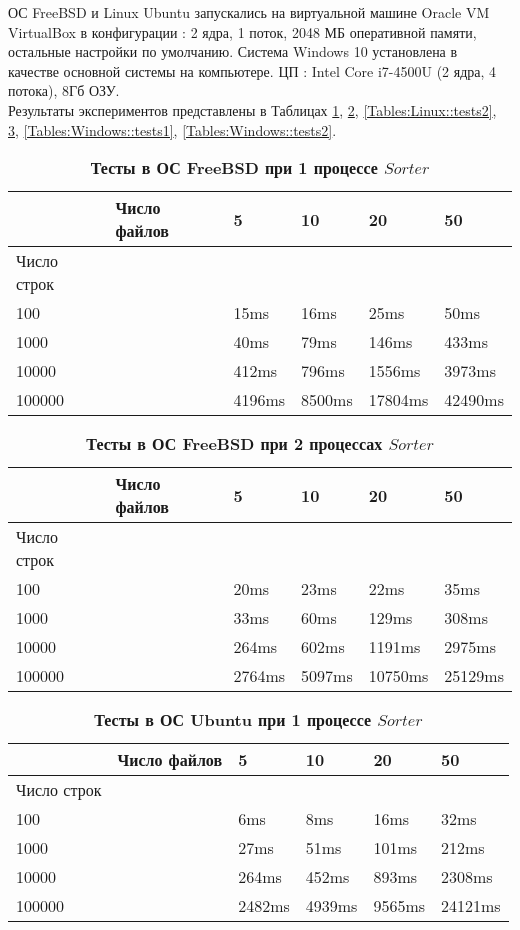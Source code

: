 ОС FreeBSD и Linux Ubuntu запускались на виртуальной машине Oracle VM VirtualBox в конфигурации : 2 ядра, 1 поток, 2048 МБ оперативной памяти, остальные настройки по умолчанию. Система Windows 10 установлена в качестве основной системы на компьютере. ЦП : Intel Core i7-4500U (2 ядра, 4 потока), 8Гб ОЗУ.\\
Результаты экспериментов представлены в Таблицах \ref{Tables:FreeBSD::tests1}, \ref{Tables:FreeBSD::tests2}, \ref{Tables:Linux::tests2}, \ref{Tables:Linux::tests1}, \ref{Tables:Windows::tests1}, \ref{Tables:Windows::tests2}.

\begin{table}[H]
\begin{tabularx}{\textwidth}{|X|X|X|X|X|X|}
\hline
&Число файлов& 5 & 10 & 20 & 50 \\
\hline
Число строк&&&&&\\
\hline
100 && 15ms & 16ms & 25ms & 50ms\\
\hline
1000 && 40ms & 79ms & 146ms & 433ms\\
\hline
10000 && 412ms & 796ms & 1556ms & 3973ms\\
\hline
100000 && 4196ms & 8500ms & 17804ms & 42490ms\\
\hline
\end{tabularx}
\caption{\textbf{Тесты в ОС FreeBSD при 1 процессе $Sorter$}}
\label{Tables:FreeBSD::tests1}
\end{table}


\begin{table}[H]
\begin{tabularx}{\textwidth}{|X|X|X|X|X|X|}
\hline
&Число файлов& 5 & 10 & 20 & 50 \\
\hline
Число строк&&&&&\\
\hline
100 && 20ms & 23ms & 22ms & 35ms\\
\hline
1000 && 33ms & 60ms & 129ms & 308ms\\
\hline
10000 && 264ms & 602ms & 1191ms & 2975ms\\
\hline
100000 && 2764ms & 5097ms & 10750ms & 25129ms\\
\hline
\end{tabularx}
\caption{\textbf{Тесты в ОС FreeBSD при 2 процессах $Sorter$}}
\label{Tables:FreeBSD::tests2}
\end{table}

\begin{table}[H]
\begin{tabularx}{\textwidth}{|X|X|X|X|X|X|}
\hline
&Число файлов& 5 & 10 & 20 & 50 \\
\hline
Число строк&&&&&\\
\hline
100 && 6ms & 8ms & 16ms & 32ms\\
\hline
1000 && 27ms & 51ms & 101ms & 212ms\\
\hline
10000 && 264ms & 452ms & 893ms & 2308ms\\
\hline
100000 && 2482ms & 4939ms & 9565ms & 24121ms\\
\hline
\end{tabularx}
\caption{\textbf{Тесты в ОС Ubuntu при 1 процессе $Sorter$}}
\label{Tables:Linux::tests1}
\end{table}



